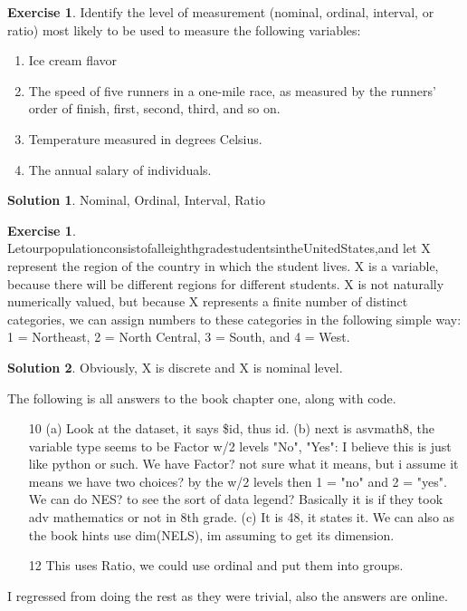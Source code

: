 \documentclass[10pt]{amsart}
\theoremstyle{definition}
\newtheorem{exer}[equation]{Exercise}
\newtheorem{sol*}{Solution}
\numberwithin{equation}{section}
\begin{document}
\begin{exer}
    Identify the level of measurement (nominal, ordinal, interval, or ratio) most likely to be used to measure the following variables:
\begin{enumerate}
    \item  Ice cream flavor
\item  The speed of five runners in a one-mile race, as measured by the runners’ order of finish,
first, second, third, and so on.
\item  Temperature measured in degrees Celsius.
\item  The annual salary of individuals.
\end{enumerate}
\end{exer}
\begin{sol*}
    Nominal, Ordinal, Interval, Ratio 
\end{sol*}
\begin{exer}
    LetourpopulationconsistofalleighthgradestudentsintheUnitedStates,and let X represent the region of the country in which the student lives. X is a variable, because there will be different regions for different students. X is not naturally numerically valued, but because X represents a finite number of distinct categories, we can assign numbers to these categories in the following simple way: 1 = Northeast, 2 = North Central, 3 = South, and 4 = West.
\end{exer}
\begin{sol*}
    Obviously, X is discrete and X is nominal level.
\end{sol*}
The following is all answers to the book chapter one, along with code.
\begin{enumerate}
    \item[10] (a) Look at the dataset, it says \$id, thus id. (b) next is asvmath8, the variable type seems to be Factor w/2 levels "No", "Yes": I believe this is just like python or such. We have Factor? not sure what it means, but i assume it means we have two choices? by the w/2 levels then 1 = "no" and 2 = "yes". We can do NES? to see the sort of data legend? Basically it is if they took adv mathematics or not in 8th grade. (c) It is 48, it states it. We can also as the book hints use dim(NELS), im assuming to get its dimension.  
    \item[12] This uses Ratio, we could use ordinal and put them into groups.
\end{enumerate}
I regressed from doing the rest as they were trivial, also the answers are online.
\end{document}
